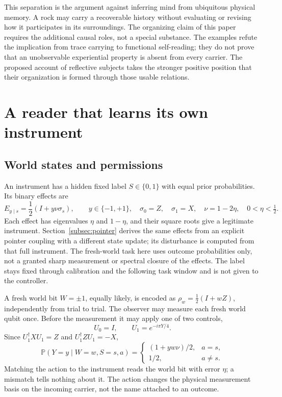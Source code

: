 \documentclass[11pt,a4paper]{article}
\newcommand{\Prb}{\mathbb P}
\begin{document}
This separation is the argument against inferring mind from ubiquitous
physical memory. A rock may carry a recoverable history without evaluating
or revising how it participates in its surroundings. The organizing claim
of this paper requires the additional causal roles, not a special substance.
The examples refute the implication from trace carrying to functional
self-reading; they do not prove that an unobservable experiential property
is absent from every carrier. The proposed account of reflective subjects
takes the stronger positive position that their organization is formed
through those usable relations.

\section{A reader that learns its own instrument}\label{sec:reader}

\subsection{World states and permissions}

An instrument has a hidden fixed label $S\in\{0,1\}$ with equal prior probabilities. Its binary effects are
\begin{equation}\label{eq:effects}
 E_{y\mid s}=\frac12(I+y\nu\sigma_s),\qquad
 y\in\{-1,+1\},\quad
 \sigma_0=Z,\quad\sigma_1=X,\quad
 \nu=1-2\eta,\quad 0<\eta<\tfrac12.
\end{equation}
Each effect has eigenvalues $\eta$ and $1-\eta$, and their square roots give a legitimate instrument. Section~\ref{subsec:pointer} derives the same effects from an explicit pointer coupling with a different state update; its disturbance is computed from that full instrument. The fresh-world task here uses outcome probabilities only, not a granted sharp measurement or spectral closure of the effects. The label stays fixed through calibration and the following task window and is not given to the controller.

A fresh world bit $W=\pm1$, equally likely, is encoded as $\rho_w=\tfrac12(I+wZ)$, independently from trial to trial. The observer may measure each fresh world qubit once. Before the measurement it may apply one of two controls,
\begin{equation}\label{eq:controls}
 U_0=I,\qquad U_1=e^{-i\pi Y/4}.
\end{equation}
Since $U_1^\dagger XU_1=Z$ and $U_1^\dagger ZU_1=-X$,
\begin{equation}\label{eq:law}
 \Prb(Y=y\mid W=w,S=s,a)=
 \begin{cases}
 (1+yw\nu)/2,&a=s,\\
 1/2,&a\ne s.
 \end{cases}
\end{equation}
Matching the action to the instrument reads the world bit with error $\eta$; a mismatch tells nothing about it. The action changes the physical measurement basis on the incoming carrier, not the name attached to an outcome.
\end{document}
